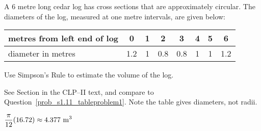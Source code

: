 \begin{question}[1996D]\label{prob_s1.11tableproblem2}
A $6$ metre long cedar log has cross sections that are approximately
circular. The diameters of the log, measured at one metre intervals, are
given below:

\renewcommand{\arraystretch}{1.1}
\begin{center}
     \begin{tabular}{|l|c|c|c|c|c|c|c|}
          \hline
          metres from left end of log&0&1&2&3&4&5&6  \\
          \hline
          diameter in metres         &1.2&1&0.8&0.8&1&1&1.2 \\
          \hline
     \end{tabular}
\end{center}
\renewcommand{\arraystretch}{1.0}

\noindent Use Simpson's Rule to estimate the volume of the log.

\end{question}

\begin{hint}
See Section  in the
CLP--II text, and compare to Question~\ref{prob_s1.11_tableproblem1}. Note the table gives diameters, not radii.
\end{hint}

\begin{answer}
$\displaystyle\frac{\pi}{12}(16.72)\approx4.377\ {\rm m}^3$
\end{answer}

